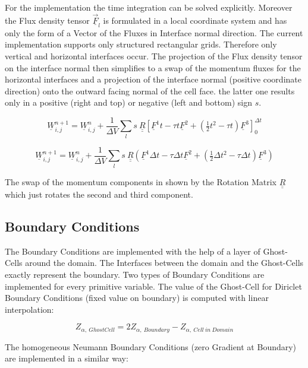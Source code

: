 \documentclass[
	pdftex,             %
	12pt,				%
	a4paper,		   	%
	english,				%
	oneside,			%
]{article}
\newcommand{\uu}[1]{\underline{#1}}
\newcommand{\uuu}[1]{\underline{\underline{#1}}}
\newcommand{\vv}[1]{\vec{#1}}
\begin{document}
For the implementation the time integration can be solved explicitly. Moreover the Flux density tensor $\uu{\vv{F}}_l$ is formulated in a local coordinate system and has only the form of a Vector of the Fluxes in Interface normal direction. The current implementation supports only structured rectangular grids. Therefore only vertical and horizontal interfaces occur. The projection of the Flux density tensor on the interface normal then simplifies to a swap of the momentum fluxes for the horizontal interfaces and a projection of the interface normal (positive coordinate direction) onto the outward facing normal of the cell face. the latter one results only in a positive (right and top) or negative (left and bottom) sign $s$.

\begin{equation}
\uu{W}_{i,j}^{n+1}
=
\uu{W}_{i,j}^{n}
+ \dfrac{1}{\Delta V}
\sum \limits_l
s ~
\uuu{R}
\left[
\uu{F}^1 t - \tau t \uu{F}^2 + (\tfrac{1}{2} t^2 - \tau t) \uu{F}^3
\right]_0^{\Delta t}
\end{equation}


\begin{equation}
\uu{W}_{i,j}^{n+1}
=
\uu{W}_{i,j}^{n}
+ \dfrac{1}{\Delta V}
\sum \limits_l
s ~
\uuu{R}
\left(
\uu{F}^1 \Delta t - \tau \Delta t \uu{F}^2 + (\tfrac{1}{2} \Delta t^2 - \tau \Delta t) \uu{F}^3
\right)
\end{equation}

The swap of the momentum components in shown by the Rotation Matrix $\uuu{R}$ which just rotates the second and third component.

\subsection*{Boundary Conditions}

The Boundary Conditions are implemented with the help of a layer of Ghost-Cells around the domain. The Interfaces between the domain and the Ghost-Cells exactly represent the boundary. Two types of Boundary Conditions are implemented for every primitive variable. The value of the Ghost-Cell for Diriclet Boundary Conditions (fixed value on boundary) is computed with linear interpolation:

\begin{equation}
Z_{\alpha,~GhostCell} = 2 Z_{\alpha,~Boundary} - Z_{\alpha,~Cell~in~Domain}
\end{equation}

The homogeneous Neumann Boundary Conditions (zero Gradient at Boundary) are implemented in a similar way:
\end{document}
